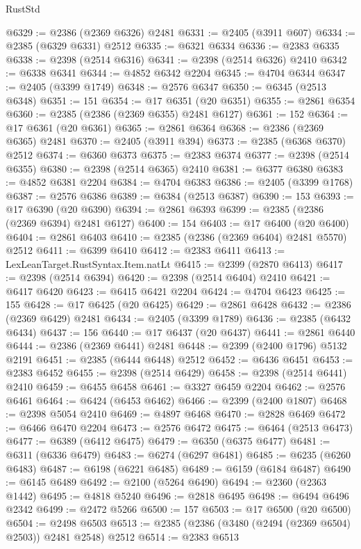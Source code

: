 \begin{lexlean}{RustStd}
\begin{coremodule}
{\begin{coremodule}
{{{{{{{{{{{{{{{{{{{{{{{{{{{{{{{{{{{{{{{{{{{{{{{{{{@6329 := @2386 (@2369 @6326) @2481
@6331 := @2405 (@3911 @607)
@6334 := @2385 (@6329 @6331) @2512
@6335 := @6321 @6334
@6336 := @2383 @6335
@6338 := @2398 (@2514 @6316)
@6341 := @2398 (@2514 @6326) @2410
@6342 := @6338 @6341
@6344 := @4852 @6342 @2204
@6345 := @4704 @6344
@6347 := @2405 (@3399 @1749)
@6348 := @2576 @6347
@6350 := @6345 (@2513 @6348)
@6351 := 151
@6354 := @17 @6351 (@20 @6351)
@6355 := @2861 @6354
@6360 := @2385 (@2386 (@2369 @6355) @2481 @6127)
@6361 := 152
@6364 := @17 @6361 (@20 @6361)
@6365 := @2861 @6364
@6368 := @2386 (@2369 @6365) @2481
@6370 := @2405 (@3911 @394)
@6373 := @2385 (@6368 @6370) @2512
@6374 := @6360 @6373
@6375 := @2383 @6374
@6377 := @2398 (@2514 @6355)
@6380 := @2398 (@2514 @6365) @2410
@6381 := @6377 @6380
@6383 := @4852 @6381 @2204
@6384 := @4704 @6383
@6386 := @2405 (@3399 @1768)
@6387 := @2576 @6386
@6389 := @6384 (@2513 @6387)
@6390 := 153
@6393 := @17 @6390 (@20 @6390)
@6394 := @2861 @6393
@6399 := @2385 (@2386 (@2369 @6394) @2481 @6127)
@6400 := 154
@6403 := @17 @6400 (@20 @6400)
@6404 := @2861 @6403
@6410 := @2385 (@2386 (@2369 @6404) @2481 @5570) @2512
@6411 := @6399 @6410
@6412 := @2383 @6411
@6413 := LexLeanTarget.RustSyntax.Item.natLt
@6415 := @2399 (@2870 @6413)
@6417 := @2398 (@2514 @6394)
@6420 := @2398 (@2514 @6404) @2410
@6421 := @6417 @6420
@6423 := @6415 @6421 @2204
@6424 := @4704 @6423
@6425 := 155
@6428 := @17 @6425 (@20 @6425)
@6429 := @2861 @6428
@6432 := @2386 (@2369 @6429) @2481
@6434 := @2405 (@3399 @1789)
@6436 := @2385 (@6432 @6434)
@6437 := 156
@6440 := @17 @6437 (@20 @6437)
@6441 := @2861 @6440
@6444 := @2386 (@2369 @6441) @2481
@6448 := @2399 (@2400 @1796) @5132 @2191
@6451 := @2385 (@6444 @6448) @2512
@6452 := @6436 @6451
@6453 := @2383 @6452
@6455 := @2398 (@2514 @6429)
@6458 := @2398 (@2514 @6441) @2410
@6459 := @6455 @6458
@6461 := @3327 @6459 @2204
@6462 := @2576 @6461
@6464 := @6424 (@6453 @6462)
@6466 := @2399 (@2400 @1807)
@6468 := @2398 @5054 @2410
@6469 := @4897 @6468
@6470 := @2828 @6469
@6472 := @6466 @6470 @2204
@6473 := @2576 @6472
@6475 := @6464 (@2513 @6473)
@6477 := @6389 (@6412 @6475)
@6479 := @6350 (@6375 @6477)
@6481 := @6311 (@6336 @6479)
@6483 := @6274 (@6297 @6481)
@6485 := @6235 (@6260 @6483)
@6487 := @6198 (@6221 @6485)
@6489 := @6159 (@6184 @6487)
@6490 := @6145 @6489
@6492 := @2100 (@5264 @6490)
@6494 := @2360 (@2363 @1442)
@6495 := @4818 @5240
@6496 := @2818 @6495
@6498 := @6494 @6496 @2342
@6499 := @2472 @5266
@6500 := 157
@6503 := @17 @6500 (@20 @6500)
@6504 := @2498 @6503
@6513 := @2385 (@2386 (@3480 (@2494 (@2369 @6504) @2503)) @2481 @2548) @2512
@6514 := @2383 @6513
}}}}}}}}}}}}}}}}}}}}}}}}}}}}}}}}}}}}}}}}}}}}}}}}}}
\end{coremodule}}
\end{coremodule}
\end{lexlean}
